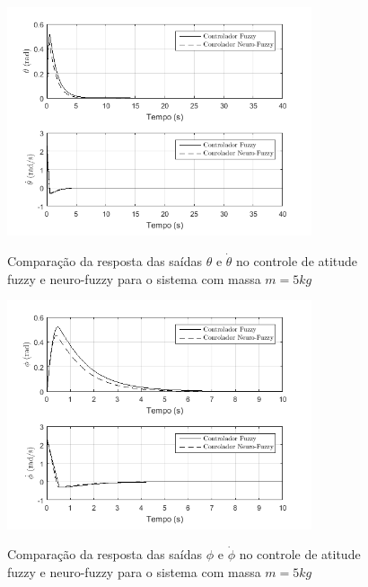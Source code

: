 \begin{figure}[!htb]
    \centering
    \caption{Comparação da resposta das saídas $\theta$ e $\dot{\theta}$ no controle de atitude fuzzy e neuro-fuzzy para o sistema com massa $m=5kg$}
    \includegraphics[width=0.8\textwidth]{./04-figuras/resultados/novos/atitude_theta_thetadot_5kg_40s}
    \label{fig:atitude_theta_thetadot_5kg_40s}
\end{figure}



\begin{figure}[!htb]
    \centering
    \caption{Comparação da resposta das saídas $\phi$ e $\dot{\phi}$ no controle de atitude fuzzy e neuro-fuzzy para o sistema com massa $m=5kg$}
    \includegraphics[width=0.8\textwidth]{./04-figuras/resultados/novos/atitude_phi_phidot_5kg_10s}
    \label{fig:atitude_phi_phidot_5kg_10s}
\end{figure}

